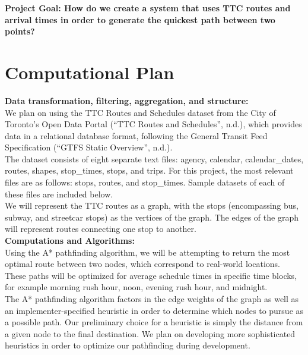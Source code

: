 \documentclass[fontsize=11pt]{article}
\begin{document}
    \noindent \textbf{Project Goal: How do we create a system that uses TTC routes and arrival times in order to generate the quickest path between two points?}

    \newpage

    \section*{Computational Plan}

    \textbf{Data transformation, filtering, aggregation, and structure:} \\
    \indent We plan on using the TTC Routes and Schedules dataset from the City of Toronto’s Open Data Portal (“TTC Routes and Schedules”, n.d.), which provides data in a relational database format, following the General Transit Feed Specification (“GTFS Static Overview”, n.d.). \\

    The dataset consists of eight separate text files: agency, calendar, calendar\_dates, routes, shapes, stop\_times, stops, and trips. For this project, the most relevant files are as follows: stops, routes, and stop\_times. Sample datasets of each of these files are included below. \\

    We will represent the TTC routes as a graph, with the stops (encompassing bus, subway, and streetcar stops) as the vertices of the graph. The edges of the graph will represent routes connecting one stop to another. \\

    \noindent \textbf{Computations and Algorithms:} \\
    \indent Using the A* pathfinding algorithm, we will be attempting to return the most optimal route between two nodes, which correspond to real-world locations. These paths will be optimized for average schedule times in specific time blocks, for example morning rush hour, noon, evening rush hour, and midnight. \\

    The A* pathfinding algorithm factors in the edge weights of the graph as well as an implementer-specified heuristic in order to determine which nodes to pursue as a possible path. Our preliminary choice for a heuristic is simply the distance from a given node to the final destination. We plan on developing more sophisticated heuristics in order to optimize our pathfinding during development. \\
\end{document}
